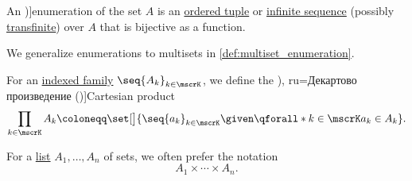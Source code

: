 \begin{definition}\label{def:set_enumeration}\mimprovised
  An \term[en=enumeration (\cite[190]{Kleene2002Logic})]{enumeration} of the set \( A \) is an \hyperref[def:ordered_tuple]{ordered tuple} or \hyperref[def:sequence]{infinite sequence} (possibly \hyperref[def:transfinite_sequence]{transfinite}) over \( A \) that is bijective as a function.
\end{definition}
\begin{comments}
  \item We generalize enumerations to multisets in \cref{def:multiset_enumeration}.
\end{comments}

\begin{definition}\label{def:cartesian_product}
  For an \hyperref[def:indexed_family]{indexed family} \( \seq{ A_k }_{k \in \mscrK} \), we define the \term[bg=Декартово произведение (\cite[367]{ГеновМиховскиМоллов1991Алгебра}), ru=Декартово произведение (\cite[146]{КолмогоровДрагалин2006ЛогикаДополнительныеГлавы})]{Cartesian product}
  \begin{equation*}
    \prod_{k \in \mscrK} A_k \coloneqq \set[\big]{ \seq{ a_k }_{k \in \mscrK} \given \qforall* {k \in \mscrK} a_k \in A_k }.
  \end{equation*}

  For a \hyperref[def:ordered_tuple]{list} \( A_1, \ldots, A_n \) of sets, we often prefer the notation
  \begin{equation*}
    A_1 \times \cdots \times A_n.
  \end{equation*}
\end{definition}

